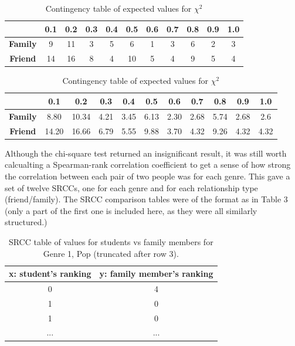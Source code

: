 \documentclass[12pt]{report}
\begin{document}
\begin{table}[h!]
\begin{center}

\begin{tabular}{ c|c|c|c|c|c|c|c|c|c|c }
  & \textbf{0.1} & \textbf{0.2} & \textbf{0.3} & \textbf{0.4} & \textbf{0.5} & \textbf{0.6} & \textbf{0.7} & \textbf{0.8} & \textbf{0.9} & \textbf{1.0} \\ 
  \hline \hline
  \textbf{Family} & 9 & 11 & 3 & 5 & 6 & 1 & 3 & 6 & 2 & 3\\
  \hline
  \textbf{Friend} & 14 & 16 & 8 & 4 & 10 & 5 & 4 & 9 & 5 & 4 \\
\end{tabular}

\caption{Contingency table of observed values for $\chi^2$}

\vspace{20pt}

\begin{tabular}{ c|c|c|c|c|c|c|c|c|c|c }
  & \textbf{0.1} & \textbf{0.2} & \textbf{0.3} & \textbf{0.4} & \textbf{0.5} & \textbf{0.6} & \textbf{0.7} & \textbf{0.8} & \textbf{0.9} & \textbf{1.0} \\
  \hline \hline
  \textbf{Family} & 8.80 & 10.34 & 4.21 & 3.45 & 6.13 & 2.30 & 2.68 & 5.74 & 2.68 & 2.6 \\
  \hline
  \textbf{Friend} & 14.20 & 16.66 & 6.79 & 5.55 & 9.88 & 3.70 & 4.32 & 9.26 & 4.32 & 4.32 \\
\end{tabular}

\caption{Contingency table of expected values for $\chi^2$}

\end{center}
\end{table}

Although the chi-square test returned an insignificant result, it was still worth calcualting a Spearman-rank correlation coefficient to get a sense of how strong the correlation between each pair of two people was for each genre. This gave a set of twelve SRCCs, one for each genre and for each relationship type (friend/family). The SRCC comparison tables were of the format as in Table 3 (only a part of the first one is included here, as they were all similarly structured.)

\begin{table}[h!]
\begin{center}
\begin{tabular}{ c|c }
 x: student's ranking & y: family member's ranking \\
 \hline
 0 & 4 \\
 \hline
 1 & 0 \\
 \hline
 1 & 0 \\
 \hline
 ... & ... \\
 \hline
\end{tabular}
\caption{SRCC table of values for students vs family members for Genre 1, Pop (truncated after row 3).}
\end{center}
\end{table}
\end{document}
